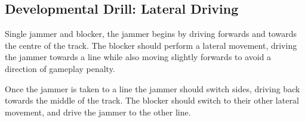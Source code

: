 \subsection*{Developmental Drill: Lateral Driving}
\label{drill:one_on_one/developmental/lateral_driving}

Single jammer and blocker, the jammer begins by driving forwards and towards the centre of the track. 
The blocker should perform a lateral movement, driving the jammer towards a line while also moving slightly forwards to avoid a direction of gameplay penalty.

Once the jammer is taken to a line the jammer should switch sides, driving back towards the middle of the track.
The blocker should switch to their other lateral movement, and drive the jammer to the other line. 
 
